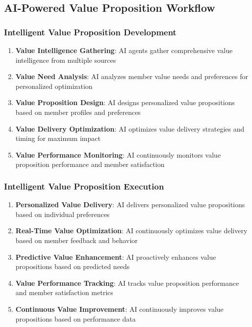 \subsection{AI-Powered Value Proposition Workflow}

\subsubsection{Intelligent Value Proposition Development}

\begin{enumerate}
    \item \textbf{Value Intelligence Gathering}: AI agents gather comprehensive value intelligence from multiple sources
    \item \textbf{Value Need Analysis}: AI analyzes member value needs and preferences for personalized optimization
    \item \textbf{Value Proposition Design}: AI designs personalized value propositions based on member profiles and preferences
    \item \textbf{Value Delivery Optimization}: AI optimizes value delivery strategies and timing for maximum impact
    \item \textbf{Value Performance Monitoring}: AI continuously monitors value proposition performance and member satisfaction
\end{enumerate}

\subsubsection{Intelligent Value Proposition Execution}

\begin{enumerate}
    \item \textbf{Personalized Value Delivery}: AI delivers personalized value propositions based on individual preferences
    \item \textbf{Real-Time Value Optimization}: AI continuously optimizes value delivery based on member feedback and behavior
    \item \textbf{Predictive Value Enhancement}: AI proactively enhances value propositions based on predicted needs
    \item \textbf{Value Performance Tracking}: AI tracks value proposition performance and member satisfaction metrics
    \item \textbf{Continuous Value Improvement}: AI continuously improves value propositions based on performance data
\end{enumerate}


